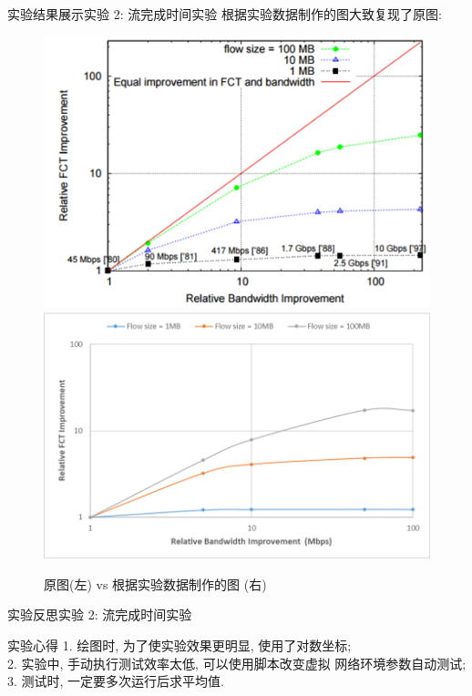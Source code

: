 \documentclass{beamer}
\begin{document}
\begin{frame}{实验结果展示}{实验 2: 流完成时间实验}
    根据实验数据制作的图大致复现了原图:
    \begin{figure}[h]
        \centering %
        \includegraphics[scale=0.45]{figs/fct-paper.png}
        \includegraphics[scale=0.4]{figs/fct-improvement.png}
        \caption{原图(左) vs 根据实验数据制作的图 (右)} %
    \end{figure}
\end{frame}

\begin{frame}{实验反思}{实验 2: 流完成时间实验}
    \begin{block}{实验心得}
        1. 绘图时, 为了使实验效果更明显, 使用了对数坐标;\\
        2. 实验中, 手动执行测试效率太低, 可以使用脚本改变虚拟
        网络环境参数自动测试;\\
        3. 测试时, 一定要多次运行后求平均值.
    \end{block}

\end{frame}
\end{document}
